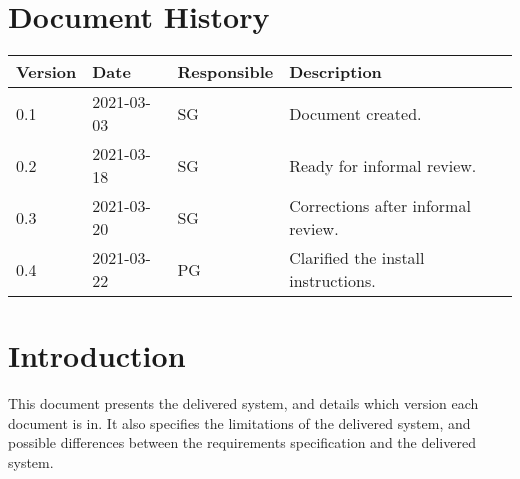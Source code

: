 \documentclass{article}
\date {#1}
\title {
    \documentNumber {01}    
    
    \documentVersion {0.4}
    
    \documentTitle {Template}
    \documentGroup {2}
    
    \documentResponsible {System Group}
    \documentAuthors {System Group}
    
    \documentDate {2021-03-22}
}
\begin{document}
\maketitle
\thispagestyle{empty}

\newpage

\tableofcontents

\newpage



\section{Document History}

\begin{tabular}{ l | l | l | l }
    Version & Date & Responsible & Description \\
    \hline
    0.1 & 2021-03-03 & SG & Document created. \\
    \hline
    0.2 & 2021-03-18 & SG & Ready for informal review. \\
    \hline
    0.3 & 2021-03-20 & SG & Corrections after informal review. \\
    \hline
    0.4 & 2021-03-22 & PG & Clarified the install instructions.
   
\end{tabular}

\section{Introduction}
    This document presents the delivered system, and details which version each document is in. It also specifies the limitations of the delivered system, and possible differences between the requirements specification and the delivered system.
\end{document}
